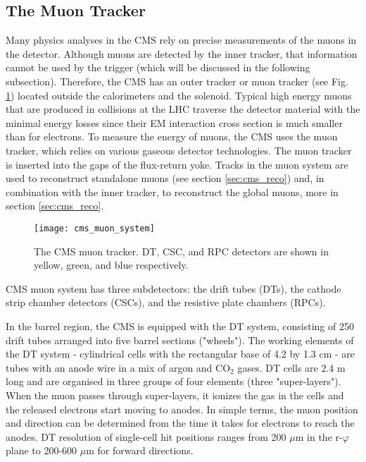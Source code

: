 \begin{normalsize}

\subsection{The Muon Tracker}

Many physics analyses in the CMS rely on precise measurements of the muons in the detector. Although muons are detected by the inner tracker, that information cannot be used by the trigger (which will be discussed in the following subsection). Therefore, the CMS has an outer tracker or muon tracker \cite{Muon_system_TDR} (see Fig. \ref{cms_muon_system}) located outside the calorimeters and the solenoid. Typical high energy muons that are produced in collisions at the LHC traverse the detector material with the minimal energy losses since their EM interaction cross section is much smaller than for electrons. To measure the energy of muons, the CMS uses the muon tracker, which relies on various gaseous detector technologies. The muon tracker is inserted into the gaps of the flux-return yoke. Tracks in the muon system are used to reconstruct standalone muons (see section \ref{sec:cms_reco}) and, in combination with the inner tracker, to reconstruct the global muons, more in section \ref{sec:cms_reco}.



 \begin{figure}[H]
  \centering
  \texttt{[image: cms\_muon\_system]}
  \caption[The CMS muon tracker]{The CMS muon tracker. DT, CSC, and RPC detectors are shown in yellow, green, and blue respectively.}
  \label{cms_muon_system}
\end{figure}

CMS muon system has three subdetectors: the drift tubes (DTs), the cathode strip chamber detectors (CSCs), and the resistive plate chambers (RPCs). 

In the barrel region, the CMS is equipped with the DT system, consisting of 250 drift tubes arranged into five barrel sections ("wheels"). The working elements of the DT system - cylindrical cells with the rectangular base of 4.2 by 1.3 cm - are tubes with an anode wire in a mix of argon and CO$_2$ gases. DT cells are 2.4 m long and are organised in three groups of four elements (three "super-layers"). When the muon passes through super-layers, it ionizes the gas in the cells and the released electrons start moving to anodes. In simple terms, the muon position and direction can be determined from the time it takes for electrons to reach the anodes. DT resolution of single-cell hit positions ranges from 200 $\mu$m in the r-$\varphi$ plane to 200-600 $\mu$m for forward directions. 


\end{normalsize}
